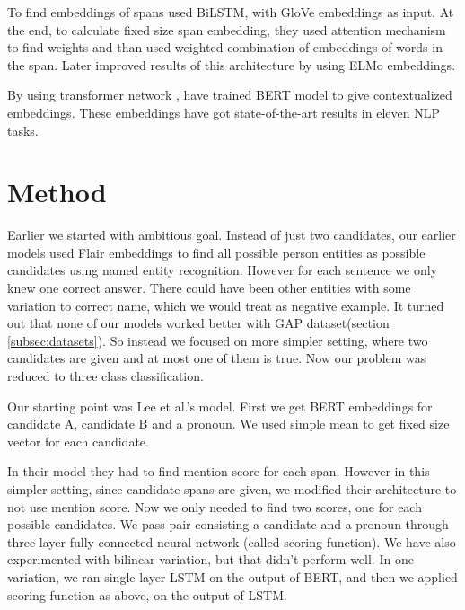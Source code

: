 \documentclass[11pt,a4paper]{article}
\begin{document}
To find embeddings of spans \citet{lee2017end} used BiLSTM, with GloVe \cite{pennington2014glove} embeddings as input. At the end, to calculate fixed size span embedding, they used attention mechanism to find weights and than used weighted combination of embeddings of words in the span. Later \citet{Peters:2018} improved results of this architecture by using ELMo embeddings.

By using transformer network \cite{vaswani2017attention}, \citet{devlin2018bert} have trained BERT model to give contextualized embeddings. These embeddings have got state-of-the-art results in eleven NLP tasks.

\section{Method}
\label{sec:method}
Earlier we started with ambitious goal. Instead of just two candidates, our earlier models used Flair embeddings to find all possible person entities as possible candidates using named entity recognition. However for each sentence we only knew one correct answer. There could have been other entities with some variation to correct name, which we would treat as negative example. It turned out that none of our models worked better with GAP dataset(section \ref{subsec:datasets}). So instead we focused on more simpler setting, where two candidates are given and at most one of them is true. Now our problem was reduced to three class classification.

Our starting point was Lee et al.'s model. First we get BERT embeddings for candidate A, candidate B and a pronoun. We used simple mean to get fixed size vector for each candidate. 

In their model they had to find mention score for each span. However in this simpler setting, since candidate spans are given, we modified their architecture to not use mention score. Now we only needed to find two scores, one for each possible candidates.  We pass pair consisting a candidate and a pronoun through three layer fully connected neural network (called scoring function).  We have also experimented with bilinear variation, but that didn't perform well. In one variation, we ran single layer LSTM on the output of BERT, and then we applied scoring function as above, on the output of LSTM.
\end{document}
